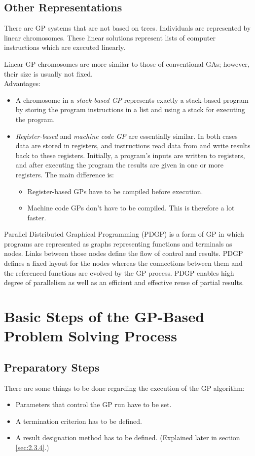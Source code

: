 \documentclass[12pt]{book}
\newcounter{subsubsubsection}[subsubsection]
\begin{document}
\subsection{Other Representations}
There are GP systems that are not based on trees.
Individuals are represented by linear chromosomes. These linear solutions represent lists of computer instructions which are executed linearly.

Linear GP chromosomes are more similar to those of conventional GAs; however, their size is usually not fixed.\\
Advantages:
\begin{itemize}
\item A chromosome in a \textit{stack-based GP} represents exactly a stack-based program by storing the program instructions in a list and using a stack for executing the program.
\item \textit{Register-based} and \textit{machine code GP} are essentially similar. In both cases data are stored in registers, and instructions read data from and write results back to these registers. Initially, a program's inputs are written to registers, and after executing the program the results are given in one or more registers. The main difference is:
\begin{itemize}
\item Register-based GPs have to be compiled before execution.
\item Machine code GPs don't have to be compiled. This is therefore a lot faster.
\end{itemize}
\end{itemize}
Parallel Distributed Graphical Programming (PDGP) is a form of GP in which programs are represented as graphs representing functions and terminals as nodes. Links between those nodes define the flow of control and results. PDGP defines a fixed layout for the nodes whereas the connections between them and the referenced functions are evolved by the GP process. PDGP enables high degree of parallelism as well as an efficient and effective reuse of partial results.
\section{Basic Steps of the GP-Based Problem Solving Process}
\subsection{Preparatory Steps}
There are some things to be done regarding the execution of the GP algorithm:
\begin{itemize}
\item Parameters that control the GP run have to be set.
\item A termination criterion has to be defined.
\item A result designation method has to be defined. (Explained later in section \ref{sec:2.3.4}.)
\end{itemize}
\end{document}
